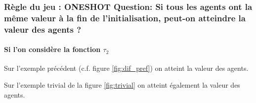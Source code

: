 \documentclass[12pt]{article}
\theoremstyle{defi}
\theoremstyle{not}
\theoremstyle{prob}
\begin{document}
      \subsubsection{Règle du jeu : ONESHOT Question: Si tous les agents ont la même valeur à la fin de l'initialisation, peut-on atteindre la valeur des agents ?}

        \paragraph{Si l'on considère la fonction $\tau_2$\\}

          Sur l'exemple précédent (c.f. figure \ref{fig:dif_pref}) on atteint la valeur des agents.

          Sur l'exemple trivial de la figure \ref{fig:trivial} on atteint également la valeur des agents.
\end{document}

